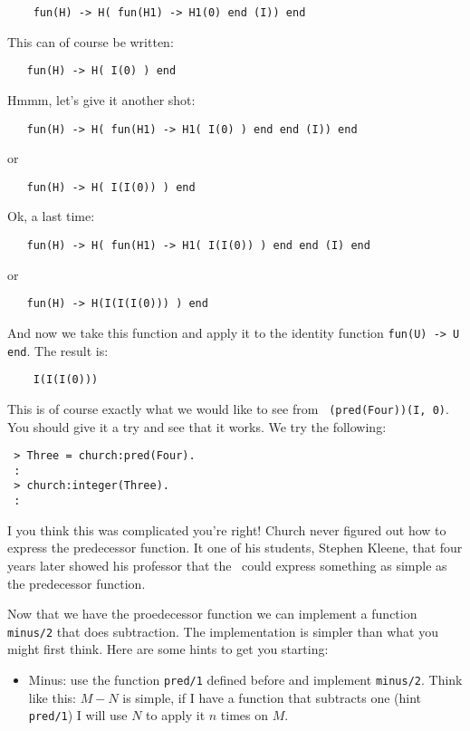 \documentclass[a4paper,11pt]{article}
\begin{document}
\begin{verbatim}
    fun(H) -> H( fun(H1) -> H1(0) end (I)) end 
\end{verbatim}

This can of course be written:
  
\begin{verbatim}
   fun(H) -> H( I(0) ) end     
\end{verbatim}
 
Hmmm, let's give it another shot:

\begin{verbatim}
   fun(H) -> H( fun(H1) -> H1( I(0) ) end end (I)) end 
\end{verbatim}
or
\begin{verbatim}  
   fun(H) -> H( I(I(0)) ) end 
\end{verbatim}

Ok, a last time:
\begin{verbatim}
   fun(H) -> H( fun(H1) -> H1( I(I(0)) ) end end (I) end 
\end{verbatim}
or
\begin{verbatim}  
   fun(H) -> H(I(I(I(0))) ) end 
\end{verbatim}

And now we take this function and apply it to the identity function
{\tt fun(U) -> U end}. The result is:

\begin{verbatim}
    I(I(I(0)))
\end{verbatim}

This is of course exactly what we would like to see from {\tt
  (pred(Four))(I, 0)}. You should give it a try and see that it works. We 
try the following:

\begin{verbatim}
 > Three = church:pred(Four).
 :
 > church:integer(Three).
 :
\end{verbatim}

I you think this was complicated you're right! Church never figured
out how to express the predecessor function. It one of his students,
Stephen Kleene, that four years later showed his professor that the
\lamc\ could express something as simple as the predecessor function. 

Now that we have the proedecessor function we can implement a function
{\tt minus/2} that does subtraction. The implementation is simpler
than what you might first think. Here are some hints to get you starting:


\begin{itemize}
\item Minus: use the function {\tt pred/1} defined before and
  implement {\tt minus/2}. Think like this: $M - N$ is simple, if I
  have a function that subtracts one (hint {\tt pred/1}) I will use
    $N$ to apply it $n$ times on $M$. 
\end{itemize}
\end{document}
